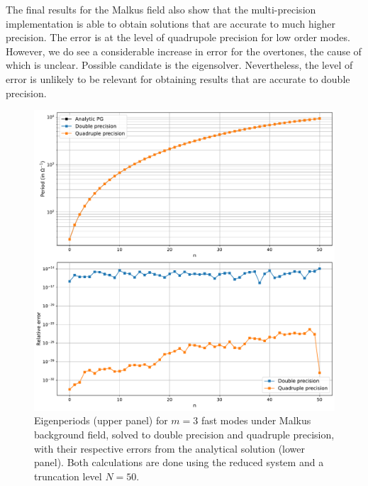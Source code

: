The final results for the Malkus field also show that the multi-precision implementation is able to obtain solutions that are accurate to much higher precision.
The error is at the level of quadrupole precision for low order modes.
However, we do see a considerable increase in error for the overtones, the cause of which is unclear. Possible candidate is the eigensolver. Nevertheless, the level of error is unlikely to be relevant for obtaining results that are accurate to double precision.

\begin{figure}[htbp]
    \centering
    \includegraphics[width=.8\linewidth]{../../out/eigen/Malkus/Reduced/Analytical_error_precision_fast.pdf}
    \caption{Eigenperiods (upper panel) for $m=3$ fast modes under Malkus background field, solved to double precision and quadruple precision, with their respective errors from the analytical solution (lower panel). Both calculations are done using the reduced system and a truncation level $N=50$.}
\end{figure}

